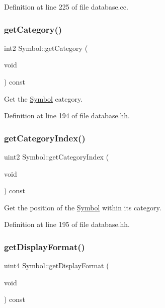 Definition at line 225 of file database.\+cc.

\mbox{\label{class_symbol_a37e66ca8bcc80b64a33a9bde0f26a72d}} 
\subsubsection{\texorpdfstring{getCategory()}{getCategory()}}
{\footnotesize\ttfamily int2 Symbol\+::get\+Category (\begin{DoxyParamCaption}\item[{void}]{ }\end{DoxyParamCaption}) const\hspace{0.3cm}{\ttfamily [inline]}}



Get the \mbox{\hyperlink{class_symbol}{Symbol}} category. 



Definition at line 194 of file database.\+hh.

\mbox{\label{class_symbol_a85304f741a156bcecd870ec8614328a5}} 
\subsubsection{\texorpdfstring{getCategoryIndex()}{getCategoryIndex()}}
{\footnotesize\ttfamily uint2 Symbol\+::get\+Category\+Index (\begin{DoxyParamCaption}\item[{void}]{ }\end{DoxyParamCaption}) const\hspace{0.3cm}{\ttfamily [inline]}}



Get the position of the \mbox{\hyperlink{class_symbol}{Symbol}} within its category. 



Definition at line 195 of file database.\+hh.

\mbox{\label{class_symbol_aeb76ebd9391dec38aec6ebb097bba76c}} 
\subsubsection{\texorpdfstring{getDisplayFormat()}{getDisplayFormat()}}
{\footnotesize\ttfamily uint4 Symbol\+::get\+Display\+Format (\begin{DoxyParamCaption}\item[{void}]{ }\end{DoxyParamCaption}) const\hspace{0.3cm}{\ttfamily [inline]}}



